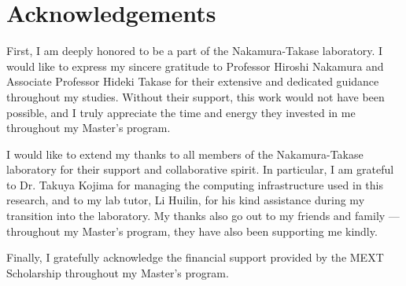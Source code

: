 \chapter{Acknowledgements}

First, I am deeply honored to be a part of the Nakamura-Takase laboratory. I would like to express my sincere gratitude to Professor Hiroshi Nakamura and Associate Professor Hideki Takase for their extensive and dedicated guidance throughout my studies. Without their support, this work would not have been possible, and I truly appreciate the time and energy they invested in me throughout my Master's program.

I would like to extend my thanks to all members of the Nakamura-Takase laboratory for their support and collaborative spirit. In particular, I am grateful to Dr. Takuya Kojima for managing the computing infrastructure used in this research, and to my lab tutor, Li Huilin, for his kind assistance during my transition into the laboratory. My thanks also go out to my friends and family --- throughout my Master's program, they have also been supporting me kindly.

Finally, I gratefully acknowledge the financial support provided by the MEXT Scholarship throughout my Master's program.